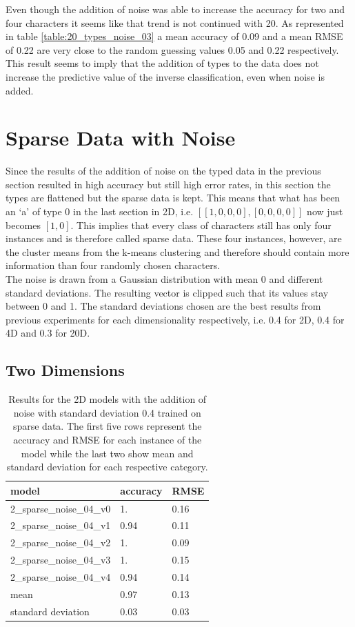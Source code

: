 Even though the addition of noise was able to increase the accuracy for two and four characters it seems like that trend is not continued with 20. As represented in table \ref{table:20_types_noise_03} a mean accuracy of 0.09 and a mean RMSE of 0.22 are very close to the random guessing values 0.05 and 0.22 respectively. This result seems to imply that the addition of types to the data does not increase the predictive value of the inverse classification, even when noise is added.

\section{Sparse Data with Noise}

Since the results of the addition of noise on the typed data in the previous section resulted in high accuracy but still high error rates, in this section the types are flattened but the sparse data is kept. This means that what has been an `a' of type 0 in the last section in 2D, i.e. $[[1,0,0,0],[0,0,0,0]]$ now just becomes $[1,0]$. This implies that every class of characters still has only four instances and is therefore called sparse data. These four instances, however, are the cluster means from the k-means clustering and therefore should contain more information than four randomly chosen characters. \\
The noise is drawn from a Gaussian distribution with mean 0 and different standard deviations. The resulting vector is clipped such that its values stay between 0 and 1. The standard deviations chosen are the best results from previous experiments for each dimensionality respectively, i.e. 0.4 for 2D, 0.4 for 4D and 0.3 for 20D.


\subsection{Two Dimensions}

\begin{table}[!htb]
	\centering
	\caption{Results for the 2D models with the addition of noise with standard deviation 0.4 trained on sparse data. The first five rows represent the accuracy and RMSE for each instance of the model while the last two show mean and standard deviation for each respective category.}
	\begin{tabularx}{\textwidth}{ X  X  X }
		\hline
		model & accuracy & RMSE \\ 
		\hline
		2\_sparse\_noise\_04\_v0 & 1. &  0.16 \\ 
		2\_sparse\_noise\_04\_v1 & 0.94 & 0.11 \\
		2\_sparse\_noise\_04\_v2 & 1.  & 0.09 \\ 
		2\_sparse\_noise\_04\_v3 & 1.  & 0.15 \\ 
		2\_sparse\_noise\_04\_v4 & 0.94 & 0.14 \\ \hline
		mean & 0.97 & 0.13\\
		standard deviation & 0.03 & 0.03\\
		\hline
	\end{tabularx}
	\label{table:2_sparse_noise_04}
\end{table}

